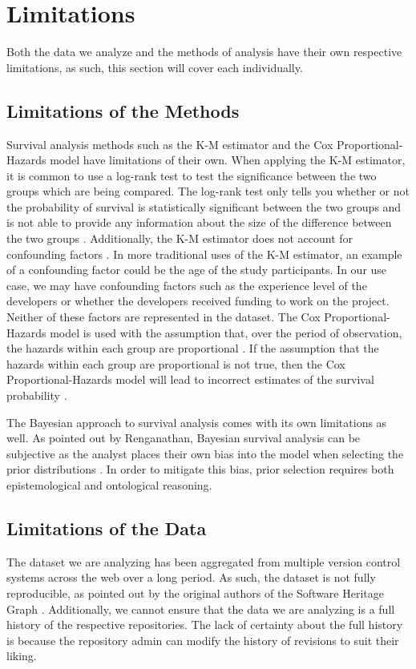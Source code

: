 \documentclass[conference]{IEEEtran}
\begin{document}
\section{Limitations}

Both the data we analyze and the methods of analysis have their own respective limitations, as such, this section will cover each individually.

\subsection{Limitations of the Methods}

Survival analysis methods such as the K-M estimator and the Cox Proportional-Hazards model have limitations of their own. When applying the K-M estimator, it is common to use a log-rank test to test the significance between the two groups which are being compared. The log-rank test only tells you whether or not the probability of survival is statistically significant between the two groups and is not able to provide any information about the size of the difference between the two groups \cite{stel2011kaplan}. Additionally, the K-M estimator does not account for confounding factors \cite{stel2011kaplan}. In more traditional uses of the K-M estimator, an example of a confounding factor could be the age of the study participants.
In our use case, we may have confounding factors such as the experience level of the developers or whether the developers received funding to work on the project.
Neither of these factors are represented in the dataset.
The Cox Proportional-Hazards model is used with the assumption that, over the period of observation, the hazards within each group are proportional \cite{stel2011cox}.
If the assumption that the hazards within each group are proportional is not true, then the Cox Proportional-Hazards model will lead to incorrect estimates of the survival probability \cite{stel2011cox}.

The Bayesian approach to survival analysis comes with its own limitations as well. As pointed out by Renganathan, Bayesian survival analysis can be subjective as the analyst places their own bias into the model when selecting the prior distributions \cite{renganathan2016overview}. In order to mitigate this bias, prior selection requires both epistemological and ontological reasoning.

\subsection{Limitations of the Data}

The dataset we are analyzing has been aggregated from multiple version control systems across the web over a long period. As such, the dataset is not fully reproducible, as pointed out by the original authors of the Software Heritage Graph \cite{pietri2019software}. Additionally, we cannot ensure that the data we are analyzing is a full history of the respective repositories. The lack of certainty about the full history is because the repository admin can modify the history of revisions to suit their liking.



\end{document}
